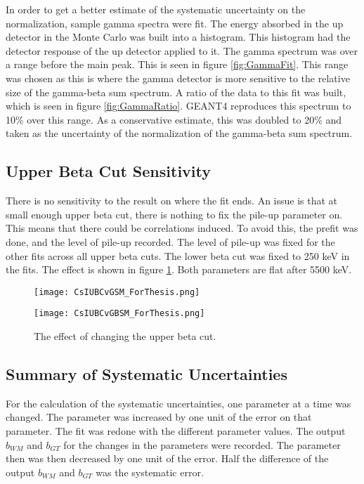 \documentclass[../MaxHughesThesis.tex]{subfiles}
\begin{document}
In order to get a better estimate of the systematic uncertainty on the normalization, sample gamma spectra were fit. 
The energy absorbed in the up detector in the Monte Carlo was built into a histogram.
This histogram had the detector response of the up detector applied to it.
The gamma spectrum was over a range before the main peak. 
This is seen in figure \ref{fig:GammaFit}.
This range was chosen as this is where the gamma detector is more sensitive to the relative size of the gamma-beta sum spectrum.
A ratio of the data to this fit was built, which is seen in figure \ref{fig:GammaRatio}.
GEANT4 reproduces this spectrum to 10\% over this range.
As a conservative estimate, this was doubled to 20\% and taken as the uncertainty of the normalization of the gamma-beta sum spectrum.


\subsection{Upper Beta Cut Sensitivity}

There is no sensitivity to the result on where the fit ends.
An issue is that at small enough upper beta cut, there is nothing to fix the pile-up parameter on. 
This means that there could be correlations induced.
To avoid this, the  prefit was done, and the level of pile-up recorded.
The level of pile-up was fixed for the other fits across all upper beta cuts.
The lower beta cut was fixed to 250 keV in the fits. 
The effect is shown in figure \ref{fig:UBCEffect}.
Both parameters are flat after 5500 keV.

\begin{figure}
    \centering
    \begin{minipage}{0.50\textwidth}
        \centerline{\texttt{[image: CsIUBCvGSM\_ForThesis.png]}}
    \end{minipage}\hfill
    \begin{minipage}{0.50\textwidth}
        \centerline{\texttt{[image: CsIUBCvGBSM\_ForThesis.png]}}
    \end{minipage}
    \caption{The effect of changing the upper beta cut.}
    \label{fig:UBCEffect}
\end{figure}

\subsection{Summary of Systematic Uncertainties}

For the calculation of the systematic uncertainties, one parameter at a time was changed.
The parameter was increased by one unit of the error on that parameter.
The fit was redone with the different parameter values.
The output $b_{WM}$ and $b_{GT}$ for the changes in the parameters were recorded.
The parameter then was then decreased by one unit of the error.
Half the difference of the output $b_{WM}$ and $b_{GT}$ was the systematic error.
\end{document}

